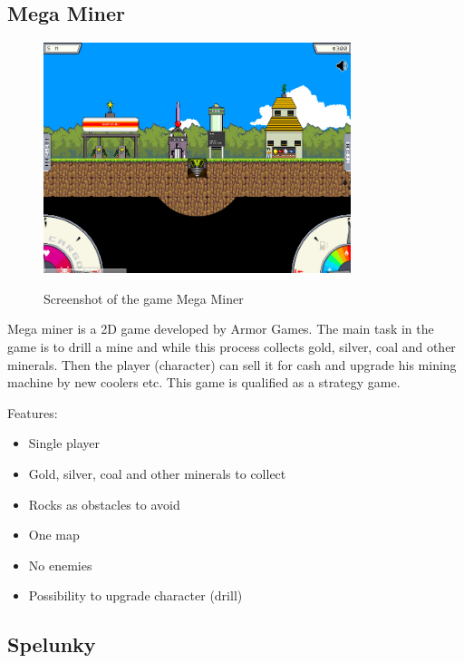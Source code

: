 \documentclass[12p]{article}
\begin{document}

\subsection{Mega Miner}

\begin{figure}[ht]
    \center
    \includegraphics[width=0.8\textwidth]{StateOfTheArtScreenshots/mega_miner}
    \label{StateOfTheArt_Screenshots_MegaMiner}
    \caption{Screenshot of the game Mega Miner \cite{MegaMinerScreenshot}}
\end{figure}

Mega miner is a 2D game developed by Armor Games. The main task in the game is to drill a mine and while this process collects gold, silver, coal and other minerals. Then the player (character) can sell it for cash and upgrade his mining machine by new coolers etc. This game is qualified as a strategy game.

Features:

\begin{itemize}
    \item Single player
    \item Gold, silver, coal and other minerals to collect
    \item Rocks as obstacles to avoid
    \item One map
    \item No enemies
    \item Possibility to upgrade character (drill)
\end{itemize}


\subsection{Spelunky}
\end{document}
